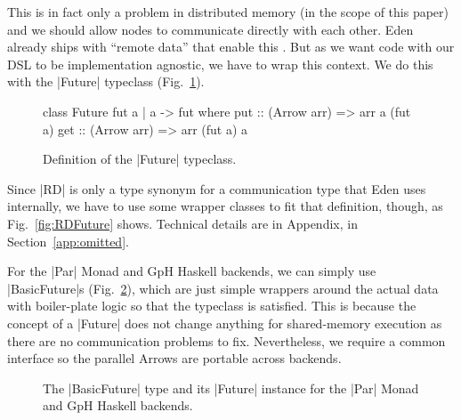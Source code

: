 This is in fact only a problem in distributed memory (in the scope of this paper) and we should  allow nodes to communicate directly with each other. Eden already ships with \enquote{remote data} that enable this \cite{AlGo03a,Dieterle2010}.
But as we want code with our DSL to be implementation agnostic, we have to wrap this context. We do this with the |Future| typeclass (Fig.~\ref{fig:future}).
\begin{figure}[h]
\begin{code}
class Future fut a | a -> fut where
    put :: (Arrow arr) => arr a (fut a)
    get :: (Arrow arr) => arr (fut a) a
\end{code}
\caption{Definition of the |Future| typeclass.}
\label{fig:future}
\end{figure}
Since |RD| is only a type synonym for a communication type that Eden uses internally, we have to use some wrapper classes to fit that definition, though, as Fig.~\ref{fig:RDFuture} shows. %
Technical details are in Appendix, in Section~\ref{app:omitted}.

For the |Par| Monad and GpH Haskell backends, we can simply use |BasicFuture|s (Fig.~\ref{fig:BasicFuture}), which are just simple wrappers around the actual data with boiler-plate logic so that the typeclass is satisfied. This is because the concept of a |Future| does not change anything for shared-memory execution as there are no communication problems to fix. Nevertheless, we require a common interface so the parallel Arrows are portable across backends.
\begin{figure}[tb]
\caption{The |BasicFuture| type and its |Future| instance for the |Par| Monad and GpH Haskell backends.}
\label{fig:BasicFuture}
\end{figure} %



